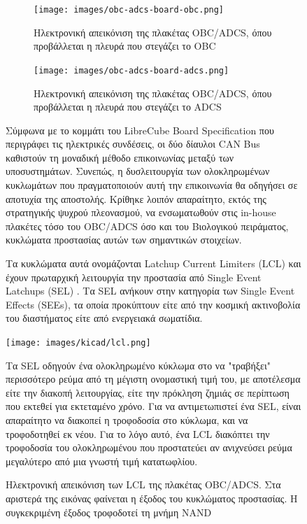 \documentclass[a4paper,nobib,justified]{tufte-book}
\begin{document}
\begin{figure}
\begin{figure}
	\centering
	\texttt{[image: images/obc-adcs-board-obc.png]}
	\caption[Ηλεκτρονική απεικόνιση της πλακέτας OBC/ADCS]{Ηλεκτρονική απεικόνιση της πλακέτας OBC/ADCS, όπου προβάλλεται η πλευρά που στεγάζει το OBC}
	\label{fig:obc-adcs-board-obc}
\end{figure}

\begin{figure}
	\centering
	\texttt{[image: images/obc-adcs-board-adcs.png]}
	\caption[Ηλεκτρονική απεικόνιση της πλακέτας OBC/ADCS]{Ηλεκτρονική απεικόνιση της πλακέτας OBC/ADCS, όπου προβάλλεται η πλευρά που στεγάζει το ADCS}
	\label{fig:obc-adcs-board-adcs}
\end{figure}
Σύμφωνα με το κομμάτι του LibreCube Board Specification που περιγράφει τις ηλεκτρικές συνδέσεις, οι δύο δίαυλοι CAN Bus καθιστούν τη μοναδική μέθοδο επικοινωνίας μεταξύ των υποσυστημάτων. Συνεπώς, η δυσλειτουργία των ολοκληρωμένων κυκλωμάτων που πραγματοποιούν αυτή την επικοινωνία θα οδηγήσει σε αποτυχία της αποστολής. Κρίθηκε λοιπόν απαραίτητο, εκτός της στρατηγικής ψυχρού πλεονασμού, να ενσωματωθούν στις in-house πλακέτες τόσο του OBC/ADCS όσο και του Βιολογικού πειράματος, κυκλώματα προστασίας αυτών των σημαντικών στοιχείων. 

Τα κυκλώματα αυτά ονομάζονται Latchup Current Limiters (LCL) και έχουν πρωταρχική λειτουργία την προστασία από Single Event Latchups (SEL) . Tα SEL ανήκουν στην κατηγορία των Single Event Effects (SEEs), τα οποία προκύπτουν είτε από την κοσμική ακτινοβολία του διαστήματος είτε από ενεργειακά σωματίδια. \begin{marginfigure}
	\centering
	\texttt{[image: images/kicad/lcl.png]}
	\caption[Ηλεκτρονική απεικόνιση των LCL]{Ηλεκτρονική απεικόνιση των LCL της πλακέτας OBC/ADCS. Στα αριστερά της εικόνας φαίνεται η έξοδος του κυκλώματος προστασίας. Η συγκεκριμένη έξοδος τροφοδοτεί τη μνήμη NAND}
	\label{fig:schematic-lcl}
\end{marginfigure} Tα SEL οδηγούν ένα ολοκληρωμένο κύκλωμα στο να "τραβήξει" περισσότερο ρεύμα από τη μέγιστη ονομαστική τιμή του, με αποτέλεσμα είτε την διακοπή λειτουργίας, είτε την πρόκληση ζημιάς σε περίπτωση που εκτεθεί για εκτεταμένο χρόνο. Για να αντιμετωπιστεί ένα SEL, είναι απαραίτητο να διακοπεί η τροφοδοσία στο κύκλωμα, και να τροφοδοτηθεί εκ νέου. Για το λόγο αυτό, ένα LCL διακόπτει την τροφοδοσία του ολοκληρωμένου που προστατεύει αν ανιχνεύσει ρεύμα μεγαλύτερο από μια γνωστή τιμή κατατωφλίου.


\end{figure}
\end{document}
